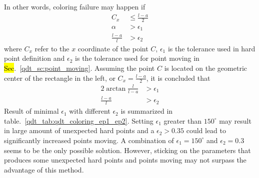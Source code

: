 %
In other words, coloring failure may happen if
    \begin{equation}
        \begin{aligned}
            C_x  &\leq \frac{l-a}{2} \\
            \alpha &> \epsilon_{1} \\
            \frac{l-a}{l} &> \epsilon_{2}
        \end{aligned}
    \end{equation}
where $C_x$ refer to the $x$ coordinate of the point $C$, $\epsilon_1$ is the tolerance used in hard point definition and $\epsilon_2$ is the tolerance used for point moving in \hl{Sec}.~\ref{qdt_sc:point_moving}.
Assuming the point $C$ is located on the geometric center of the rectangle in the left, or $C_x = \frac{l-a}{2}$, it is concluded that 
    \begin{equation}
        \begin{aligned}
            2 \arctan \frac{l}{l-a} &> \epsilon_1 \\
            \frac{l-a}{l} &> \epsilon_{2}
        \end{aligned}
    \end{equation}
%
Result of minimal $\epsilon_1$ with different $\epsilon_2$ is summarized in table.~\ref{qdt_tab:qdt_coloring_ep1_ep2}.
Setting $\epsilon_1$ greater than $150^\circ$ may result in large amount of unexpected hard points and a $\epsilon_2 > 0.35$ could lead to significantly increased points moving.
A combination of $\epsilon_1 = 150^\circ$ and $\epsilon_2 = 0.3$ seems to be the only possible solution.
However, sticking on the parameters that produces some unexpected hard points and points moving may not surpass the advantage of this method.

